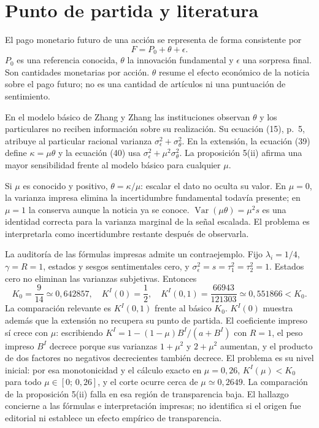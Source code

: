 \documentclass[11pt]{article}
\newcommand{\Var}{\operatorname{Var}}
\begin{document}
\section{Punto de partida y literatura}
El pago monetario futuro de una acción se representa de forma consistente por
\begin{equation}\label{eq:payoff}
 F=P_0+\theta+\epsilon.
\end{equation}
$P_0$ es una referencia conocida, $\theta$ la innovación fundamental y
$\epsilon$ una sorpresa final. Son cantidades monetarias por acción.
$\theta$ resume el efecto económico de la noticia sobre el pago futuro;
no es una cantidad de artículos ni una puntuación de sentimiento.

En el modelo básico de Zhang y Zhang las instituciones observan $\theta$
y los particulares no reciben información sobre su realización. Su ecuación
(15), p.~5, atribuye al particular racional varianza
$\sigma_\epsilon^2+\sigma_\theta^2$. En la extensión, la ecuación (39)
define $\kappa=\mu\theta$ y la ecuación (40) usa
$\sigma_\epsilon^2+\mu^2\sigma_\theta^2$. La proposición 5(ii) afirma
una mayor sensibilidad frente al modelo básico para cualquier $\mu$.

Si $\mu$ es conocido y positivo, $\theta=\kappa/\mu$: escalar el dato no
oculta su valor. En $\mu=0$, la varianza impresa elimina la incertidumbre
fundamental todavía presente; en $\mu=1$ la conserva aunque la noticia
ya se conoce. $\Var(\mu\theta)=\mu^2s$ es una identidad correcta para la
varianza marginal de la señal escalada. El problema es interpretarla como
incertidumbre restante después de observarla.

La auditoría de las fórmulas impresas admite un contraejemplo. Fijo
$\lambda_i=1/4$, $\gamma=R=1$, estados y sesgos sentimentales cero, y
$\sigma_\epsilon^2=s=\tau_1^2=\tau_2^2=1$. Estados cero no eliminan las
varianzas subjetivas. Entonces
\begin{equation}\label{eq:counter}
 K_0=\frac9{14}\simeq0{,}642857,\quad
 K^I(0)=\frac12,\quad K^I(0{,}1)=\frac{66943}{121303}\simeq0{,}551866<K_0.
\end{equation}
La comparación relevante es $K^I(0{,}1)$ frente al básico $K_0$.
$K^I(0)$ muestra además que la extensión no recupera su punto de partida.
El coeficiente impreso sí crece con $\mu$: escribiendo
$K^I=1-(1-\mu)B^I/(a+B^I)$ con $R=1$, el peso impreso $B^I$ decrece porque
sus varianzas $1+\mu^2$ y $2+\mu^2$ aumentan, y el producto de dos
factores no negativos decrecientes también decrece. El problema es su nivel
inicial: por esa monotonicidad y el cálculo exacto en $\mu=0{,}26$,
$K^I(\mu)<K_0$ para todo $\mu\in[0;\,0{,}26]$, y el corte ocurre cerca de
$\mu\simeq0{,}2649$. La comparación de la proposición 5(ii) falla en esa
región de transparencia baja.
El hallazgo concierne a las fórmulas e interpretación impresas; no identifica
si el origen fue editorial ni establece un efecto empírico de transparencia.
\end{document}
